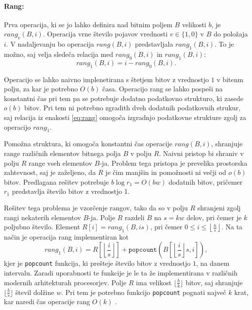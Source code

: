 \paragraph{Rang:} 
Prva operacija, ki se jo lahko definira nad bitnim poljem $B$ velikosti $b$, je $rang_v(B,i)$. Operacija vrne število pojavov vrednosti $v\in\{1,0\}$ v $B$ do položaja $i$. V nadaljevanju bo operacija $rang(B,i)$ predstavljala $rang_1(B,i)$. To je možno, saj velja sledeča relacija med $rang_0(B,i)$ in $rang_1(B,i)$:
\begin{equation}\label{eq:rang}
    rang_1(B,i)=i-rang_0(B,i).
\end{equation}

Operacijo se lahko naivno implenetirana s štetjem bitov z vrednostjo $1$ v bitenm polju, za kar je potrebno $O(b)$ časa. Operacijo rang se lahko pospeši na konstantni čas pri tem pa se potrebuje dodatno podatkovno strukturo, ki zasede $o(b)$ bitov. Pri tem ni potrebno zgradith dveh dodatnih podatkovnih strukur, saj relacija iz enakosti \ref{eq:rang} omogoča izgradnjo podatkovne strukture zgolj za operacijo $rang_1$.

Pomožna struktura, ki omogoča konstantni čas operacije $rang(B,i)$, shranjuje range različnih elementov bitnega polja $B$ v polju $R$. Naivni pristop bi shraniv v polju $R$ range vseh elementov $B$-ja. Problem tega pristopa je prevelika prostorska zahtevnost, saj je zaželjeno, da $R$ je čim manjšin in pomožnosti ni večji od $o(b)$ bitov. Predlagana rešitev potrebuje $b\log{r_1}=O(bw)$ dodatnih bitov, pričemer $r_1$ predstavlja število bitov z vrednostjo 1.

Rešitev tega problema je vzorčenje rangov, tako da so v polju $R$ shranjeni zgolj rangi nekaterih elementov $B$-ja. Polje $R$ razdeli $B$ na $s=kw$ delov, pri čemer je $k$ poljubno število. Element $R[i]=rang_1(B,is)$, pri čemer $0\le i \le \left\lfloor\frac{n}{s} \right\rfloor$. Na ta način je operacija rang implementiran kot 
\begin{equation}
    rang_1(B,i)=R\left[\left\lfloor\frac{i}{s} \right\rfloor\right] + \texttt{popcount}\left(B\left[\left\lfloor\frac{i}{s} \right\rfloor s,i\right]\right),
\end{equation}
kjer je \texttt{popcount} funkcija, ki prešteje število bitov z vrednostjo $1$, na danem intervalu. Zaradi uporabnosti te funkcije je le ta že implementirana v različnih modernih arhitekturah procesorjev. Polje $R$ ima velikost $\lfloor\frac{b}{k}\rfloor$ bitov, saj shranjuje $\lfloor\frac{b}{s}\rfloor$ števil dolžine $w$. Pri tem je potrebno funkcijo \texttt{popcount} pognati največ $k$ krat, kar naredi čas operacije rang $O(k)$ \cite{Navarro2016}.

